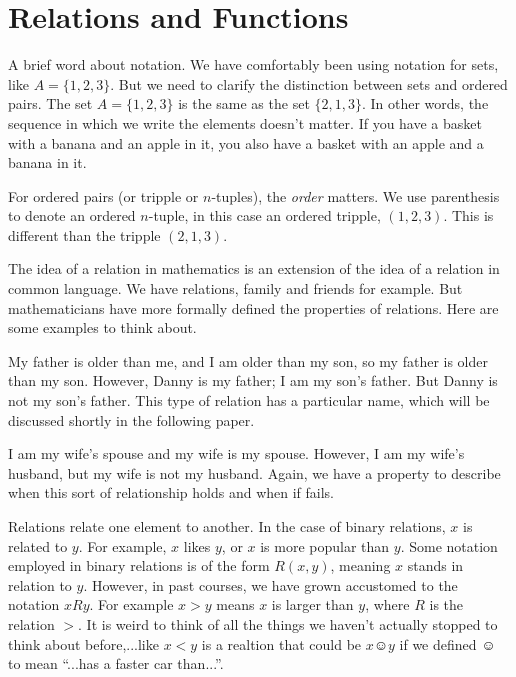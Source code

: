 \section{Relations and Functions}

A brief word about notation.  We have comfortably been using notation for sets, like $A = \{1, 2, 3 \}$.  But we need to clarify the distinction between sets and ordered pairs.  The set  $A = \{1, 2, 3 \}$ is the same as the set  $\{2, 1, 3 \}$.  In other words, the sequence in which we write the elements doesn't matter.  If you have a basket with a banana and an apple in it, you also have a basket with an apple and a banana in it.  

For ordered pairs (or tripple or $n$-tuples), the \emph{order} matters.  We use parenthesis to denote an ordered $n$-tuple, in this case an ordered tripple, $(1, 2, 3)$.  This is different than the tripple $(2, 1, 3)$.  


The idea of a relation in mathematics is an extension of the idea of a relation in common language.  We have relations, family and friends for example.  But mathematicians have more formally defined the properties of relations.   Here are some examples to think about.

\begin{example}
My father is older than me, and I am older than my son, so my father is older than my son.  However, Danny is my father; I am my son's father.  But Danny is not my son's father. This type of relation has a particular name, which will be discussed shortly in the following paper.
\end{example}\label{age}

\begin{example}[Spouse]
I am my wife's spouse and my wife is my spouse.  However, I am my wife's husband, but my wife is not my husband.  Again, we have a property to describe when this sort of relationship holds and when if fails.
\end{example}

Relations relate one element to another.  In the case of binary relations, $x$ is related to $y$.  For example, $x$ likes $y$, or $x$ is more popular than $y$.  Some notation employed in binary relations is of the form $R(x,y)$, meaning $x$ stands in relation to $y$.  However, in past courses, we have grown accustomed to the notation $xRy$.  For example $x>y$ means $x$ is larger than $y$, where $R$ is the relation $>$.  It is weird to think of all the things we haven't actually stopped to think about before,...like $x<y$ is a realtion that could be $x\smiley y$ if we defined $\smiley$ to mean ``...has a faster car than...''.


